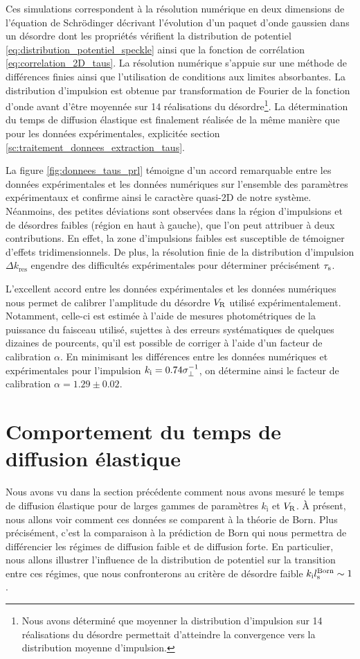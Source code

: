 Ces simulations correspondent à la résolution numérique en deux dimensions de l'équation de Schrödinger décrivant l'évolution d'un paquet d'onde gaussien dans un désordre dont les propriétés vérifient la distribution de potentiel \ref{eq:distribution_potentiel_speckle} ainsi que la fonction de corrélation \ref{eq:correlation_2D_taus}. La résolution numérique s'appuie sur une méthode de différences finies ainsi que l'utilisation de conditions aux limites absorbantes. La distribution d'impulsion est obtenue par transformation de Fourier de la fonction d'onde avant d'être moyennée sur 14 réalisations du désordre\footnote{Nous avons déterminé que moyenner la distribution d'impulsion sur 14 réalisations du désordre permettait d'atteindre la convergence vers la distribution moyenne d'impulsion.}. La détermination du temps de diffusion élastique est finalement réalisée de la même manière que pour les données expérimentales, explicitée section \ref{sc:traitement_donnees_extraction_taus}.

La figure \ref{fig:donnees_taus_prl} témoigne d'un accord remarquable entre les données expérimentales et les données numériques sur l'ensemble des paramètres expérimentaux et confirme ainsi le caractère quasi-2D de notre système. Néanmoins, des petites déviations sont observées dans la région d'impulsions et de désordres faibles (région en haut à gauche), que l'on peut attribuer à deux contributions. En effet, la zone d'impulsions faibles est susceptible de témoigner d'effets tridimensionnels. De plus, la résolution finie de la distribution d'impulsion $\Delta k_{\mathrm{res}}$ engendre des difficultés expérimentales pour déterminer précisément $\tau_{\mathrm{s}}$.

L'excellent accord entre les données expérimentales et les données numériques nous permet de calibrer l'amplitude du désordre $V_{\mathrm{R}}$ utilisé expérimentalement. Notamment, celle-ci est estimée à l'aide de mesures photométriques de la puissance du faisceau utilisé, sujettes à des erreurs systématiques de quelques dizaines de pourcents, qu'il est possible de corriger à l'aide d'un facteur de calibration $\alpha$. En minimisant les différences entre les données numériques et expérimentales pour l'impulsion $k_{\mathrm{i}}=0.74 \sigma_{\perp}^{-1}$, on détermine ainsi le facteur de calibration $\alpha=1.29\pm0.02$.




\section{Comportement du temps de diffusion élastique}
\label{sc:comportement_taus}
Nous avons vu dans la section précédente comment nous avons mesuré le temps de diffusion élastique pour de larges gammes de paramètres $k_{\mathrm{i}}$ et $V_{\mathrm{R}}$. À présent, nous allons voir comment ces données se comparent à la théorie de Born. Plus précisément, c'est la comparaison à la prédiction de Born qui nous permettra de différencier les régimes de diffusion faible et de diffusion forte. En particulier, nous allons illustrer l'influence de la distribution de potentiel sur la transition entre ces régimes, que nous confronterons au critère de désordre faible $k_{\mathrm{i}}l_{\mathrm{s}}^{\mathrm{Born}}\sim 1$.

